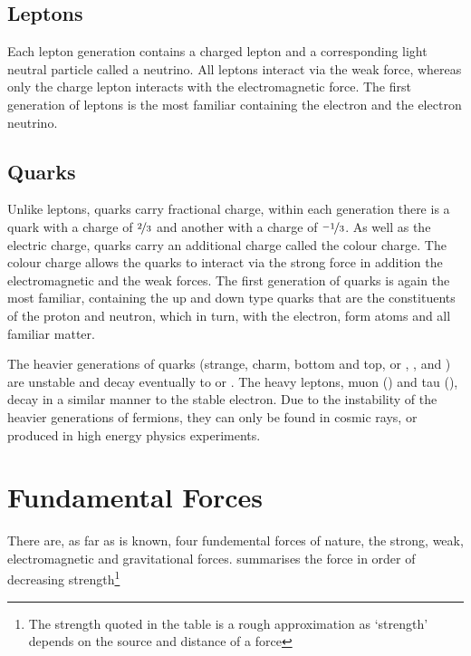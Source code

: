 \subsection{Leptons}
Each lepton generation contains a charged lepton and a corresponding light
neutral particle called a neutrino. All leptons interact via the weak force,
whereas only the charge lepton interacts with the electromagnetic force.  The
first generation of leptons is the most familiar containing the electron and the
electron neutrino.

\subsection{Quarks}
Unlike leptons, quarks carry fractional charge, within each generation there is
a quark with a charge of $\nicefrac{2}{3}$ and another with a charge of
$\nicefrac{-1}{3}$. As well as the electric charge, quarks carry an additional
charge called the colour charge. The colour charge allows the quarks to interact
via the strong force in addition the electromagnetic and the weak forces.
The first generation of quarks is again the most familiar, containing the up and
down type quarks that are the constituents of the proton and neutron, which in
turn, with the electron, form atoms and all familiar matter.


The heavier generations of quarks (strange, charm, bottom and top, or \Pstrange,
\Pcharm, \Pbottom and \Ptop) are unstable and decay eventually to \Pup or
\Pdown.
The heavy leptons, muon (\Pmuon) and tau (\Ptau), decay in a similar manner to
the stable electron. 
Due to the instability of the heavier generations of fermions, they can only be
found in  cosmic rays, or produced in high energy physics experiments.

\section{Fundamental Forces}
\label{sec:forces}

There are, as far as is known, four fundemental forces of nature, the strong,
weak, electromagnetic and gravitational forces.
 summarises the force in order of decreasing
strength\footnote{The strength quoted in the table is a rough approximation as
`strength' depends on the source and distance of a force\cite{griffiths}}

